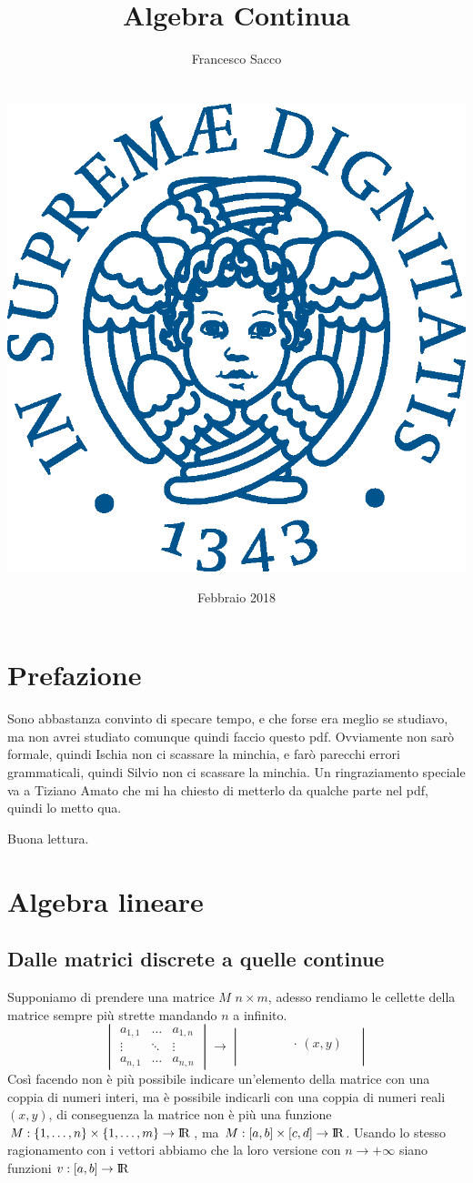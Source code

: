 \documentclass[11pt,a4paper]{report}
\date{{\LARGE Febbraio 2018}}
\title{{\myfont Algebra Continua}}
\author{{\Huge Francesco Sacco}\\ \\ \\
		\includegraphics[scale=0.6]{Immagini/cherubino.eps}\\}
\theoremstyle{definition}
\theoremstyle{plain}
\theoremstyle{plain}
\begin{document}
	\maketitle
	\tableofcontents
	\chapter*{Prefazione}
		Sono abbastanza convinto di specare tempo, e che forse era meglio se studiavo, ma non avrei studiato comunque quindi faccio questo pdf.\newline
		Ovviamente non sarò formale, quindi Ischia non ci scassare la minchia, e farò parecchi errori grammaticali, quindi Silvio non ci scassare la minchia.\newline
		Un ringraziamento speciale va a Tiziano Amato che mi ha chiesto di metterlo da qualche parte nel pdf, quindi lo metto qua.\newline

		Buona lettura.
	
	\chapter{Algebra lineare}
		\section{Dalle matrici discrete a quelle continue}
			Supponiamo di prendere una matrice $M$ $ n \times m$, adesso rendiamo le cellette della matrice sempre più strette mandando $n$ a infinito.
			\begin{equation}
				\begin{vmatrix}
					a_{1,1} & \dots & a_{1,n} \\
					\vdots	&	\ddots&	\vdots	\\
					a_{n,1} & \dots & a_{n,n} 
				\end{vmatrix}
				\longrightarrow
				\begin{vmatrix}
					&\quad & & \\
					&\ &\quad \cdot \, (x,y) & \\
					& & & \\
				\end{vmatrix}
			\end{equation}
			Così facendo non è più possibile indicare un'elemento della matrice con una coppia di numeri interi, ma è possibile indicarli con una coppia di numeri reali $(x,y)$, di  conseguenza la matrice non è più una funzione $M:\{1,\dots,n\}\times\{1,\dots,m\} \rightarrow \rm I\!R$, ma $M:[a,b]\times [c,d]\rightarrow \rm I\!R$.\newline
			Usando lo stesso ragionamento con i vettori abbiamo che la loro versione con $n\rightarrow +\infty$ siano funzioni $v:[a,b]\rightarrow \rm I\!R$ 
		
\end{document}
